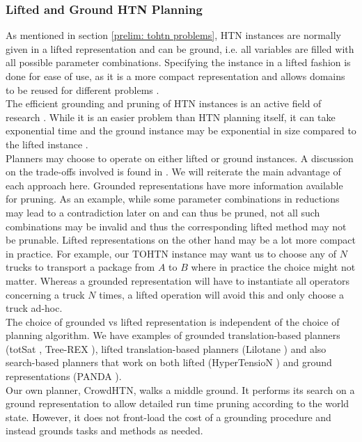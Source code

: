 \subsubsection{Lifted and Ground HTN Planning}
As mentioned in section \ref{prelim: tohtn problems}, HTN instances are normally given in a lifted representation and can be ground, i.e. all variables are filled with all possible parameter combinations. Specifying the instance in a lifted fashion is done for ease of use, as it is a more compact representation and allows domains to be reused for different problems \cite{behnke2020succinct}. \\
The efficient grounding and pruning of HTN instances is an active field of research \cite{ramoul2017grounding, behnke2020succinct}. While it is an easier problem than HTN planning itself, it can take exponential time and the ground instance may be exponential in size compared to the lifted instance \cite{behnke2020succinct}. \\
Planners may choose to operate on either lifted or ground instances. A discussion on the trade-offs involved is found in \cite{schreiber2021lilotane}. We will reiterate the main advantage of each approach here. Grounded representations have more information available for pruning. As an example, while some parameter combinations in reductions may lead to a contradiction later on and can thus be pruned, not all such combinations may be invalid and thus the corresponding lifted method may not be prunable. Lifted representations on the other hand may be a lot more compact in practice. For example, our TOHTN instance may want us to choose any of $N$ trucks to transport a package from $A$ to $B$ where in practice the choice might not matter. Whereas a grounded representation will have to instantiate all operators concerning a truck $N$ times, a lifted operation will avoid this and only choose a truck ad-hoc. \\
The choice of grounded vs lifted representation is independent of the choice of planning algorithm. We have examples of grounded translation-based planners (totSat \cite{behnke2018totsat}, Tree-REX \cite{schreiber2019tree}), lifted translation-based planners (Lilotane \cite{schreiber2021lilotane}) and also search-based planners that work on both lifted (HyperTensioN \cite{magnaguagno2020hypertension}) and ground representations (PANDA \cite{holler2020htn}). \\
Our own planner, CrowdHTN, walks a middle ground. It performs its search on a ground representation to allow detailed run time pruning according to the world state. However, it does not front-load the cost of a grounding procedure and instead grounds tasks and methods as needed.
